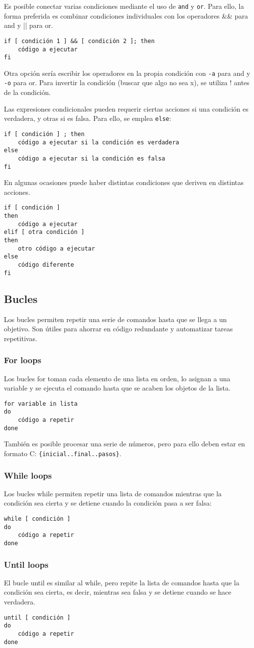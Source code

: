 Es posible conectar varias condiciones mediante el uso de \texttt{and} y \texttt{or}. Para ello, la forma preferida es combinar condiciones individuales con los operadores \&\& para and y || para or.
\begin{lstlisting}
if [ condición 1 ] && [ condición 2 ]; then
	código a ejecutar
fi
\end{lstlisting}

Otra opción sería escribir los operadores en la propia condición con \texttt{-a} para and y \texttt{-o} para or. Para invertir la condición (buscar que algo no sea x), se utiliza ! antes de la condición.

Las expresiones condicionales pueden requerir ciertas acciones si una condición es verdadera, y otras si es falsa. Para ello, se emplea \texttt{else}:
\begin{lstlisting}
if [ condición ] ; then
	código a ejecutar si la condición es verdadera
else
	código a ejecutar si la condición es falsa
fi
\end{lstlisting}

En algunas ocasiones puede haber distintas condiciones que deriven en distintas acciones.
\begin{lstlisting}
if [ condición ]
then
	código a ejecutar
elif [ otra condición ]
then
	otro código a ejecutar
else
	código diferente
fi
\end{lstlisting}

\subsection{Bucles}
Los bucles permiten repetir una serie de comandos hasta que se llega a un objetivo. Son útiles para ahorrar en código redundante y automatizar tareas repetitivas. 
\subsubsection{For loops}
Los bucles for toman cada elemento de una lista en orden, lo asignan a una variable y se ejecuta el comando hasta que se acaben los objetos de la lista.
\begin{lstlisting}
for variable in lista
do
	código a repetir
done
\end{lstlisting}

También es posible procesar una serie de números, pero para ello deben estar en formato C: \texttt{\{inicial..final..pasos\}}.

\subsubsection{While loops}
Los bucles while permiten repetir una lista de comandos mientras que la condición sea cierta y se detiene cuando la condición pasa a ser falsa:
\begin{lstlisting}
while [ condición ]
do
	código a repetir
done
\end{lstlisting}

\subsubsection{Until loops}
El bucle until es similar al while, pero repite la lista de comandos hasta que la condición sea cierta, es decir, mientras sea falsa y se detiene cuando se hace verdadera.
\begin{lstlisting}
until [ condición ]
do
	código a repetir
done
\end{lstlisting}